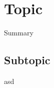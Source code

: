 \documentclass[../main]{subfiles}
\begin{document}

\section{Topic}
\begin{framed}
  Summary
\end{framed}

\subsection{Subtopic}

asd
\end{document}
